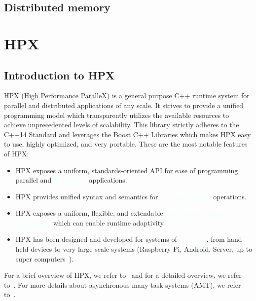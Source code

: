 \documentclass[11pt,fleqn]{book} %
\begin{document}
\chapter{Distributed memory}


\newpage
\theendnotes


\part{HPX}
\label{sec:hpx}

\chapter{Introduction to HPX}
HPX (High Performance ParalleX) is a general purpose C++ runtime system for parallel and distributed applications of any scale. It strives to provide a unified programming model which transparently utilizes the available resources to achieve unprecedented levels of scalability.  This library strictly adheres to the C++14 Standard and leverages the Boost C++ Libraries which makes HPX easy to use, highly optimized, and very portable. These are the most notable features of HPX:
\vspace{0.25cm}
\begin{itemize}
\item HPX exposes a uniform, standards-oriented API for ease of programming parallel and \textcolor{azure}{distributed} applications.
\item HPX provides unified syntax and semantics for \textcolor{azure}{local and remote} operations.
\item HPX exposes a uniform, flexible, and extendable \textcolor{azure}{performance counter framework}~\cite{grubel2016dynamic,grubel2016using} which can enable runtime adaptivity
\item HPX has been designed and developed for systems of \textcolor{azure}{any scale}, from hand-held devices to very large scale systems (Raspberry Pi, Android, Server, up to super computers~\cite{daiss2019piz,heller2019harnessing}).
\end{itemize}
\vspace{0.25cm}
For a brief overview of HPX, we refer to~\cite{heller2017hpx} and for a detailed overview, we refer to~\cite{heller2019extending}. For more details about asynchronous many-task systems (AMT), we refer to~\cite{thoman2018taxonomy}.
\end{document}
